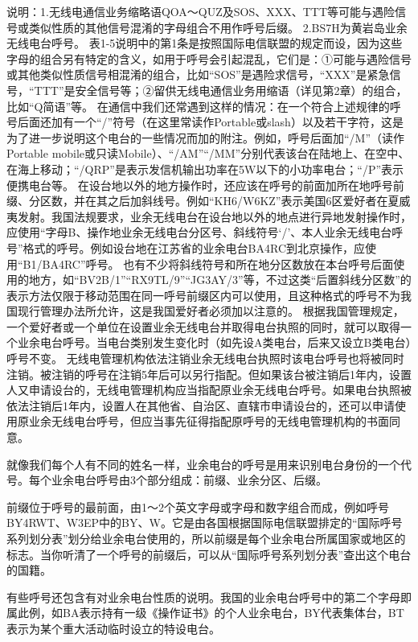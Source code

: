 \documentclass[12pt,UTF8]{ctexbook}
\begin{document}
说明：1.无线电通信业务缩略语QOA～QUZ及SOS、XXX、TTT等可能与遇险信号或类似性质的其他信号混淆的字母组合不用作呼号后缀。
2.BS7H为黄岩岛业余无线电台呼号。
表1-5说明中的第1条是按照国际电信联盟的规定而设，因为这些字母的组合另有特定的含义，如用于呼号会引起混乱，它们是：①可能与遇险信号或其他类似性质信号相混淆的组合，比如“SOS”是遇险求信号，“XXX”是紧急信号，“TTT”是安全信号等；②留供无线电通信业务用缩语（详见第2章）的组合，比如“Q简语”等。
在通信中我们还常遇到这样的情况：在一个符合上述规律的呼号后面还加有一个“/”符号（在这里常读作Portable或slash）以及若干字符，这是为了进一步说明这个电台的一些情况而加的附注。例如，呼号后面加“/M”（读作Portable mobile或只读Mobile）、“/AM”“/MM”分别代表该台在陆地上、在空中、在海上移动；“/QRP”是表示发信机输出功率在5W以下的小功率电台；“/P”表示便携电台等。
在设台地以外的地方操作时，还应该在呼号的前面加所在地呼号前缀、分区数，并在其之后加斜线号。例如“KH6/W6KZ”表示美国6区爱好者在夏威夷发射。我国法规要求，业余无线电台在设台地以外的地点进行异地发射操作时，应使用“字母B、操作地业余无线电台分区号、斜线符号‘/’、本人业余无线电台呼号”格式的呼号。例如设台地在江苏省的业余电台BA4RC到北京操作，应使用“B1/BA4RC”呼号。
也有不少将斜线符号和所在地分区数放在本台呼号后面使用的地方，如“BV2B/1”“RX9TL/9”“JG3AY/3”等，不过这类“后置斜线分区数”的表示方法仅限于移动范围在同一呼号前缀区内可以使用，且这种格式的呼号不为我国现行管理办法所允许，这是我国爱好者必须加以注意的。
根据我国管理规定，一个爱好者或一个单位在设置业余无线电台并取得电台执照的同时，就可以取得一个业余电台呼号。当电台类别发生变化时（如先设A类电台，后来又设立B类电台）呼号不变。
无线电管理机构依法注销业余无线电台执照时该电台呼号也将被同时注销。被注销的呼号在注销5年后可以另行指配。但如果该台被注销后1年内，设置人又申请设台的，无线电管理机构应当指配原业余无线电台呼号。如果电台执照被依法注销后1年内，设置人在其他省、自治区、直辖市申请设台的，还可以申请使用原业余无线电台呼号，但应当事先征得指配原呼号的无线电管理机构的书面同意。


就像我们每个人有不同的姓名一样，业余电台的呼号是用来识别电台身份的一个代号。每个业余电台呼号由3个部分组成：前缀、业余分区、后缀。

前缀位于呼号的最前面，由1～2个英文字母或字母和数字组合而成，例如呼号BY4RWT、W3EP中的BY、W。它是由各国根据国际电信联盟排定的“国际呼号系列划分表”划分给业余电台使用的，所以前缀是每个业余电台所属国家或地区的标志。当你听清了一个呼号的前缀后，可以从“国际呼号系列划分表”查出这个电台的国籍。

有些呼号还包含有对业余电台性质的说明。我国的业余电台呼号中的第二个字母即属此例，如BA表示持有一级《操作证书》的个人业余电台，BY代表集体台，BT表示为某个重大活动临时设立的特设电台。
\end{document}
